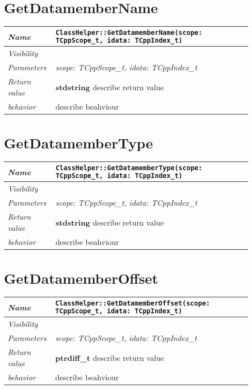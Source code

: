 \section{GetDatamemberName}
\begin{longtable}{p{3cm} @{\hskip 1cm} p{12cm}}
\hline
\textit{Name} & \texttt{ClassHelper::GetDatamemberName(scope: TCppScope_t, idata: TCppIndex_t)}\\
\hline
\textit{Visibility} & \\
\hline
\textit{Parameters} & \textit{scope: TCppScope_t, idata: TCppIndex_t}\\
\hline
\textit{Return value} & \textbf{ stdstring} describe return value\\
 \hline
\textit{behavior} & describe beahviour \\
\hline
\end{longtable} \pagebreak
\section{GetDatamemberType}
\begin{longtable}{p{3cm} @{\hskip 1cm} p{12cm}}
\hline
\textit{Name} & \texttt{ClassHelper::GetDatamemberType(scope: TCppScope_t, idata: TCppIndex_t)}\\
\hline
\textit{Visibility} & \\
\hline
\textit{Parameters} & \textit{scope: TCppScope_t, idata: TCppIndex_t}\\
\hline
\textit{Return value} & \textbf{ stdstring} describe return value\\
 \hline
\textit{behavior} & describe beahviour \\
\hline
\end{longtable} \pagebreak
\section{GetDatamemberOffset}
\begin{longtable}{p{3cm} @{\hskip 1cm} p{12cm}}
\hline
\textit{Name} & \texttt{ClassHelper::GetDatamemberOffset(scope: TCppScope_t, idata: TCppIndex_t)}\\
\hline
\textit{Visibility} & \\
\hline
\textit{Parameters} & \textit{scope: TCppScope_t, idata: TCppIndex_t}\\
\hline
\textit{Return value} & \textbf{ ptrdiff_t} describe return value\\
 \hline
\textit{behavior} & describe beahviour \\
\hline
\end{longtable} \pagebreak
